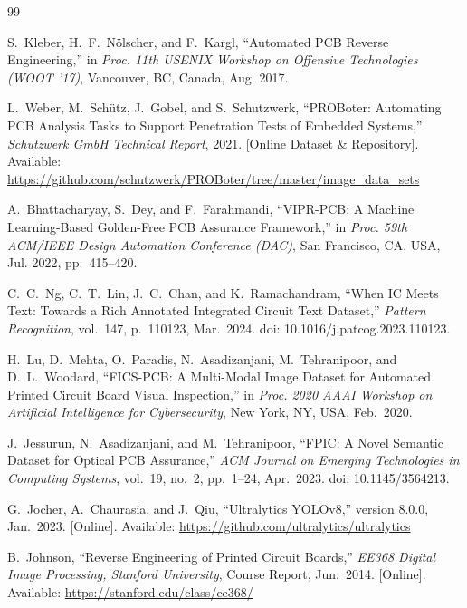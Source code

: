 \documentclass[12pt,a4paper]{report}
\begin{document}
\begin{thebibliography}{99}

S.~Kleber, H.~F.~N\"{o}lscher, and F.~Kargl,
``Automated PCB Reverse Engineering,''
in \textit{Proc. 11th USENIX Workshop on Offensive Technologies (WOOT '17)},
Vancouver, BC, Canada, Aug. 2017.

L.~Weber, M.~Sch\"{u}tz, J.~Gobel, and S.~Schutzwerk,
``PROBoter: Automating PCB Analysis Tasks to Support Penetration Tests of Embedded Systems,''
\textit{Schutzwerk GmbH Technical Report},
2021. [Online Dataset \& Repository]. Available: \url{https://github.com/schutzwerk/PROBoter/tree/master/image_data_sets}

A.~Bhattacharyay, S.~Dey, and F.~Farahmandi,
``VIPR-PCB: A Machine Learning-Based Golden-Free PCB Assurance Framework,''
in \textit{Proc. 59th ACM/IEEE Design Automation Conference (DAC)},
San Francisco, CA, USA, Jul. 2022, pp.~415--420.

C.~C.~Ng, C.~T.~Lin, J.~C.~Chan, and K.~Ramachandram,
``When IC Meets Text: Towards a Rich Annotated Integrated Circuit Text Dataset,''
\textit{Pattern Recognition}, vol.~147, p.~110123, Mar.~2024.
doi: 10.1016/j.patcog.2023.110123.

H.~Lu, D.~Mehta, O.~Paradis, N.~Asadizanjani, M.~Tehranipoor, and D.~L.~Woodard,
``FICS-PCB: A Multi-Modal Image Dataset for Automated Printed Circuit Board Visual Inspection,''
in \textit{Proc. 2020 AAAI Workshop on Artificial Intelligence for Cybersecurity},
New York, NY, USA, Feb.~2020.

J.~Jessurun, N.~Asadizanjani, and M.~Tehranipoor,
``FPIC: A Novel Semantic Dataset for Optical PCB Assurance,''
\textit{ACM Journal on Emerging Technologies in Computing Systems},
vol.~19, no.~2, pp.~1--24, Apr.~2023.
doi: 10.1145/3564213.

G.~Jocher, A.~Chaurasia, and J.~Qiu,
``Ultralytics YOLOv8,''
version 8.0.0, Jan.~2023. [Online]. Available: \url{https://github.com/ultralytics/ultralytics}

B.~Johnson,
``Reverse Engineering of Printed Circuit Boards,''
\textit{EE368 Digital Image Processing, Stanford University},
Course Report, Jun.~2014.
[Online]. Available: \url{https://stanford.edu/class/ee368/}


\end{thebibliography}
\end{document}
